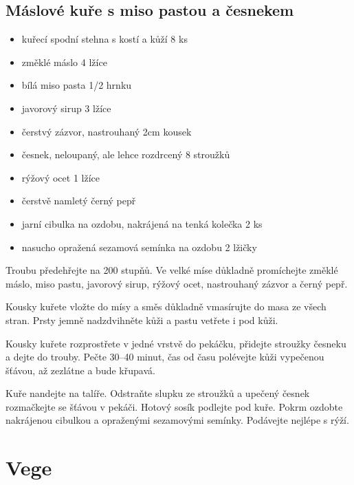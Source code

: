 \documentclass[10pt,a4paper]{article}
\newenvironment{myitemize}
{ \begin{itemize}
    \setlength{\itemsep}{0pt}
    \setlength{\parskip}{0pt}
    \setlength{\parsep}{0pt}     }
{ \end{itemize}                  }
\begin{document}
\subsection{Máslové kuře s miso pastou a česnekem}
\begin{minipage}[t]{0,5\textwidth}
\begin{myitemize} 
\item kuřecí spodní stehna s kostí a kůží 8 ks
\item změklé máslo 4 lžíce
\item bílá miso pasta 1/2 hrnku
\item javorový sirup 3 lžíce
\item čerstvý zázvor, nastrouhaný 2cm kousek
\item česnek, neloupaný, ale lehce rozdrcený 8 stroužků
\item rýžový ocet 1 lžíce
\item čerstvě namletý černý pepř
\item jarní cibulka na ozdobu, nakrájená na tenká kolečka 2 ks
\item nasucho opražená sezamová semínka na ozdobu 2 lžičky
\end{myitemize}
\end{minipage}
\begin{minipage}[t]{0,5\textwidth}
Troubu předehřejte na 200 stupňů. Ve velké míse důkladně promíchejte změklé máslo, miso pastu, javorový sirup, rýžový ocet, nastrouhaný zázvor a černý pepř.

Kousky kuřete vložte do mísy a směs důkladně vmasírujte do masa ze všech stran. Prsty jemně nadzdvihněte kůži a pastu vetřete i pod kůži.

Kousky kuřete rozprostřete v jedné vrstvě do pekáčku, přidejte stroužky česneku a dejte do trouby. Pečte 30–40 minut, čas od času polévejte kůži vypečenou šťávou, až zezlátne a bude křupavá.

Kuře nandejte na talíře. Odstraňte slupku ze stroužků a upečený česnek rozmačkejte se šťávou v pekáči. Hotový sosík podlejte pod kuře. Pokrm ozdobte nakrájenou cibulkou a opraženými sezamovými semínky. Podávejte nejlépe s rýží.
\end{minipage}

\pagebreak
\section{Vege}
\end{document}
